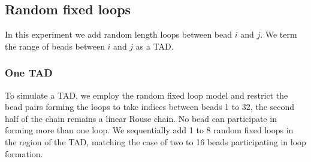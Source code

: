 \documentclass[12pt]{paper}
\begin{document}
\begin{figure}[H]
\label{encounterHistogram1To10InternalLoops}
\end{figure}


\subsection{Random fixed loops}
In this experiment we add random length loops between bead $i$ and $j$. We term the range of beads between $i$ and $j$ as a TAD. 

\subsubsection{One TAD}
To simulate a TAD, we employ the random fixed loop model and restrict the bead pairs forming the loops to take indices between beads 1 to 32, the second half of the chain remains a linear Rouse chain. No bead can participate in forming more than one loop. 
We sequentially add 1 to 8 random fixed loops in the region of the TAD, matching the case of two to 16 beads participating in loop formation. 
\end{document}
